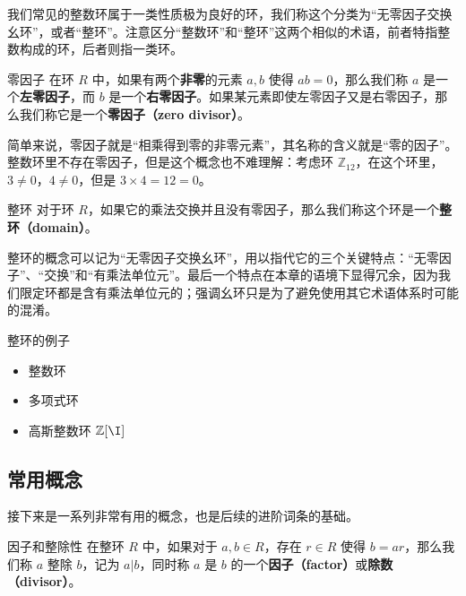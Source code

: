 
\begin{issues}
\end{issues}





我们常见的整数环属于一类性质极为良好的环，我们称这个分类为“无零因子交换幺环”，或者“整环”。注意区分“整数环”和“整环”这两个相似的术语，前者特指整数构成的环，后者则指一类环。

\begin{definition}{零因子}\label{def_Domain_1}
在环 $R$ 中，如果有两个\textbf{非零}的元素 $a, b$ 使得 $ab=0$，那么我们称 $a$ 是一个\textbf{左零因子}，而 $b$ 是一个\textbf{右零因子}。如果某元素即使左零因子又是右零因子，那么我们称它是一个\textbf{零因子（zero divisor）}。
\end{definition}

简单来说，零因子就是“相乘得到零的非零元素”，其名称的含义就是“零的因子”。整数环里不存在零因子，但是这个概念也不难理解：考虑环 $\mathbb{Z}_{12}$，在这个环里，$3\not=0$，$4\not=0$，但是 $3\times 4=12=0$。

\begin{definition}{整环}
对于环 $R$，如果它的乘法交换并且没有零因子，那么我们称这个环是一个\textbf{整环（domain）}。
\end{definition}

整环的概念可以记为“无零因子交换幺环”，用以指代它的三个关键特点：“无零因子”、“交换”和“有乘法单位元”。最后一个特点在本章的语境下显得冗余，因为我们限定环都是含有乘法单位元的；强调幺环只是为了避免使用其它术语体系时可能的混淆。

\begin{example}{整环的例子}
\begin{itemize}
\item 整数环
\item 多项式环
\item 高斯整数环 $\mathbb{Z}[\I]$
\end{itemize}

\end{example}

\subsection{常用概念}

接下来是一系列非常有用的概念，也是后续的进阶词条的基础。

\begin{definition}{因子和整除性}
在整环 $R$ 中，如果对于 $a, b\in R$，存在 $r\in R$ 使得 $b=ar$，那么我们称 $a$ 整除 $b$，记为 $a|b$，同时称 $a$ 是 $b$ 的一个\textbf{因子（factor）}或\textbf{除数（divisor）}。
\end{definition}

